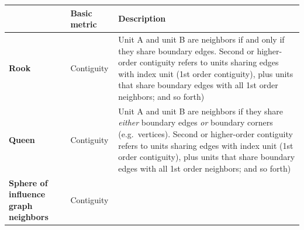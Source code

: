 \documentclass[
]{book}
\begin{document}
\begin{longtable}[]{@{}lll@{}}
\toprule
\begin{minipage}[b]{0.13\columnwidth}\raggedright
\strut
\end{minipage} & \begin{minipage}[b]{0.14\columnwidth}\raggedright
Basic metric\strut
\end{minipage} & \begin{minipage}[b]{0.63\columnwidth}\raggedright
Description\strut
\end{minipage}\tabularnewline
\midrule
\endhead
\begin{minipage}[t]{0.13\columnwidth}\raggedright
\textbf{Rook}\strut
\end{minipage} & \begin{minipage}[t]{0.14\columnwidth}\raggedright
Contiguity\strut
\end{minipage} & \begin{minipage}[t]{0.63\columnwidth}\raggedright
Unit A and unit B are neighbors if and only if they share boundary edges. Second or higher-order contiguity refers to units sharing edges with index unit (1st order contiguity), plus units that share boundary edges with all 1st order neighbors; and so forth)\strut
\end{minipage}\tabularnewline
\begin{minipage}[t]{0.13\columnwidth}\raggedright
\textbf{Queen}\strut
\end{minipage} & \begin{minipage}[t]{0.14\columnwidth}\raggedright
Contiguity\strut
\end{minipage} & \begin{minipage}[t]{0.63\columnwidth}\raggedright
Unit A and unit B are neighbors if they share \emph{either} boundary edges \emph{or} boundary corners (e.g.~vertices). Second or higher-order contiguity refers to units sharing edges with index unit (1st order contiguity), plus units that share boundary edges with all 1st order neighbors; and so forth)\strut
\end{minipage}\tabularnewline
\begin{minipage}[t]{0.13\columnwidth}\raggedright
\textbf{Sphere of influence graph neighbors}\strut
\end{minipage} & \begin{minipage}[t]{0.14\columnwidth}\raggedright
Contiguity\strut
\end{minipage} & \begin{minipage}[t]{0.63\columnwidth}\raggedright

\end{minipage}
\end{longtable}
\end{document}
